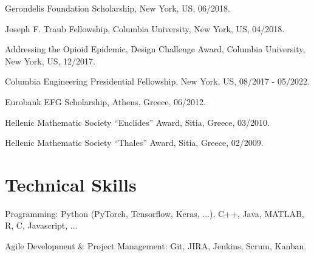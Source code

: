 \documentclass[letterpaper]{article}
\renewenvironment{itemize}{
  \begin{list}{}{
    \setlength{\leftmargin}{1.5em}
  }
}{
  \end{list}
}
\begin{document}
\begin{itemize}

  \item Gerondelis Foundation Scholarship, New York, US, 06/2018.
\item Joseph F. Traub Fellowship, Columbia University, New York, US, 04/2018.
\item Addressing the Opioid Epidemic, Design Challenge Award, Columbia University, New York, US, 12/2017.
\item Columbia Engineering Presidential Fellowship, New York, US, 08/2017 - 05/2022.
\item Eurobank EFG Scholarship, Athens, Greece, 06/2012.
\item Hellenic Mathematic Society ``Euclides'' Award, Sitia, Greece, 03/2010.
\item Hellenic Mathematic Society ``Thales'' Award, Sitia, Greece, 02/2009.
\end{itemize}


\section*{Technical Skills}
\begin{itemize}
    \item Programming: Python (PyTorch, Tensorflow, Keras, ...), C++, Java, MATLAB, R, C, Javascript, ...
    \item Agile Development \& Project Management: Git, JIRA, Jenkins, Scrum, Kanban.
\end{itemize}
\iffalse
\section*{Extracurricular Activities}
\begin{itemize}
    \item Music: bass guitar, guitar, clarinet, ukulele, guitalele.
    \item Sports: windsurfing, tennis, squash, running, hiking.
    \item Dance: salsa (in progress), cretan folk.
    \item Photography: dslr, mobile.
\end{itemize}

\section*{Languages}
\begin{itemize}
    \item English (fluent), French (intermediate), Greek (native), Spanish (beginner).
\end{itemize}
\fi
\end{document}
